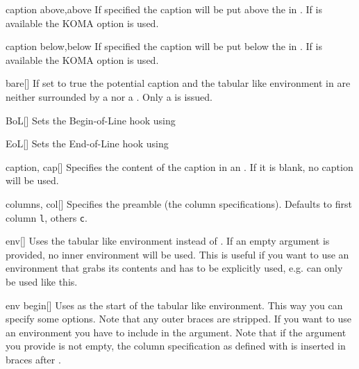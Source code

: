 \begin{describeopt}{caption above,above}%
  If specified the caption will be put above the  in
  . If  is available the KOMA option
   is used.
\end{describeopt}%
\begin{describeopt}{caption below,below}%
  If specified the caption will be put below the  in
  . If  is available the KOMA option
   is used.
\end{describeopt}%
\begin{describeopt}{bare}[]%
  If set to true the potential caption and the tabular like environment in
   are neither surrounded by a  nor a .
  Only a  is issued.
\end{describeopt}%
\begin{describeopt}{BoL}[]%
  Sets the  Begin-of-Line hook using 
\end{describeopt}%
\begin{describeopt}{EoL}[]%
  Sets the  End-of-Line hook using 
\end{describeopt}%
\begin{describeopt}{caption, cap}[]%
  Specifies the content of the caption in an . If it is blank, no
  caption will be used.
\end{describeopt}%
\begin{describeopt}{columns, col}[]%
  Specifies the  preamble (the column specifications). Defaults
  to first column \texttt{l}, others \texttt{c}.
\end{describeopt}%
\begin{describeopt}{env}[]%
  Uses the tabular like environment  instead of . If
  an empty argument is provided, no inner environment will be used. This is
  useful if you want to use an environment that grabs its contents and has to be
  explicitly used, e.g.  can only be used like this.
\end{describeopt}%
\begin{describeopt}{env begin}[]%
  Uses  as the start of the tabular like environment. This way you
  can specify some options. Note that any outer braces are stripped. If you want
  to use an environment you have to include  in the argument. Note
  that if the argument you provide is not empty, the column specification as
  defined with  is inserted in braces after .
\end{describeopt}%
